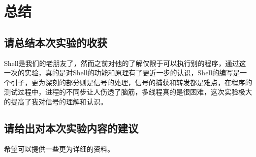 \section{总结}

\subsection{请总结本次实验的收获}
Shell是我们的老朋友了，然而之前对他的了解仅限于可以执行别的程序，通过这一次的实验，真的是对Shell的功能和原理有了更近一步的认识，Shell的编写是一个引子，更为深刻的部分则是信号的处理，信号的捕获和转发都是难点，在程序的测试过程中，进程的不同步让人伤透了脑筋，多线程真的是很困难，这次实验极大的提高了我对信号的理解和认识。

\subsection{请给出对本次实验内容的建议}
希望可以提供一些更为详细的资料。